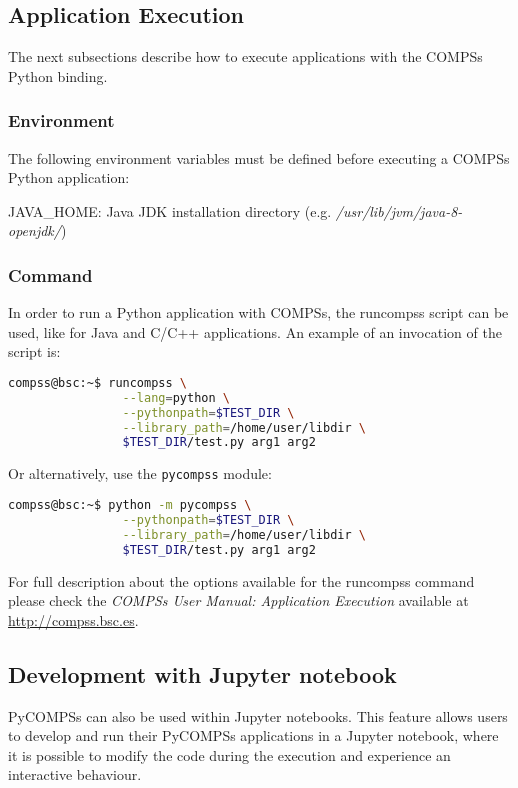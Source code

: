 \subsection{Application Execution}
The next subsections describe how to execute applications with the COMPSs Python binding.

\subsubsection{Environment}
The following environment variables must be defined before executing a COMPSs Python application:

JAVA\_HOME: Java JDK installation directory (e.g. \textit{/usr/lib/jvm/java-8-openjdk/})

\subsubsection{Command}
In order to run a Python application with COMPSs, the runcompss script can be used, like for 
Java and C/C++ applications. An example of an invocation of the script is:

\begin{lstlisting}[language=bash]
compss@bsc:~$ runcompss \
                --lang=python \
                --pythonpath=$TEST_DIR \
                --library_path=/home/user/libdir \
                $TEST_DIR/test.py arg1 arg2
\end{lstlisting}

Or alternatively, use the \verb|pycompss| module:

\begin{lstlisting}[language=bash]
compss@bsc:~$ python -m pycompss \
                --pythonpath=$TEST_DIR \
                --library_path=/home/user/libdir \
                $TEST_DIR/test.py arg1 arg2
\end{lstlisting}

For full description about the options available for the runcompss command please check the \textit{COMPSs User Manual: Application
Execution} available at \url{http://compss.bsc.es}. 

\subsection{Development with Jupyter notebook}

PyCOMPSs can also be used within Jupyter notebooks. 
This feature allows users to develop and run their PyCOMPSs applications in a Jupyter notebook, where it is possible to modify the code during the execution and experience an interactive behaviour.


